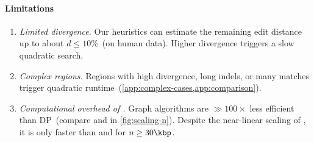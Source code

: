 \paragraph{Limitations} \phantom{x}
\nopagebreaklist

\begin{enumerate}
  \item \emph{Limited divergence.} %
        Our heuristics can estimate the remaining edit distance up to about
        $d{\leq}10\%$~(on human data). Higher divergence triggers a slow
        quadratic search.
  \item \emph{Complex regions.} %
        Regions with high divergence, long indels, or many matches trigger
        quadratic runtime~(\cref{app:complex-cases,app:comparison}).
  \item \emph{Computational overhead of \A.} %
        Graph algorithms are ${\gg} 100\times$ less efficient than DP~(compare
        \dijkstra and \edlib in \cref{fig:scaling-n}). Despite the near-linear
        scaling of \astarpa, it is only faster than \edlib and \wfa for $n \geq 30\kbp$.
\end{enumerate}

